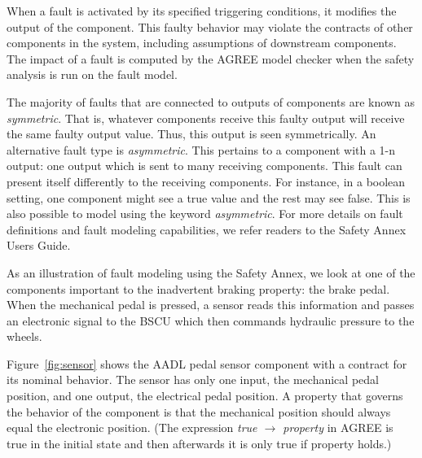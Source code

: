 When a fault is activated by its specified triggering conditions, it modifies the output of the component. This faulty behavior may violate the contracts of other components in the system, including assumptions of downstream components. The impact of a fault is computed by the AGREE model checker when the safety analysis is run on the fault model. 

The majority of faults that are connected to outputs of components are known as \textit{symmetric}. That is, whatever components receive this faulty output will receive the same faulty output value. Thus, this output is seen symmetrically. An alternative fault type is \textit{asymmetric}. This pertains to a component with a 1-n output: one output which is sent to many receiving components. This fault can present itself differently to the receiving components. For instance, in a boolean setting, one component might see a true value and the rest may see false. This is also possible to model using the keyword \textit{asymmetric}. For more details on fault definitions and fault modeling capabilities, we refer readers to the Safety Annex Users Guide\cite{SAGithub}.

As an illustration of fault modeling using the Safety Annex, we look at one of the components important to the inadvertent braking property: the brake pedal. When the mechanical pedal is pressed, a sensor reads this information and passes an electronic signal to the BSCU which then commands hydraulic pressure to the wheels. 

Figure~\ref{fig:sensor} shows the AADL pedal sensor component with a contract for its nominal behavior. The sensor has only one input, the mechanical pedal position, and one output, the electrical pedal position. 
A property that governs the behavior of the component is that the mechanical position should always equal the electronic position. (The expression \textit{true $\rightarrow$ property} in AGREE is true in the initial state and then afterwards it is only true if property holds.)

